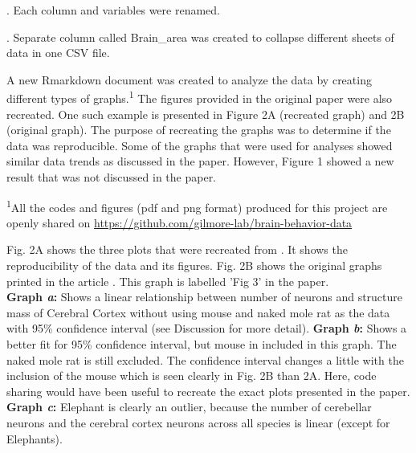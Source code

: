 \documentclass[landscape,final,paperwidth=48in,paperheight=48in,fontscale=0.285]{baposter}
\begin{document}
\begin{poster}
{. Each column and variables were renamed.

. Separate column called Brain\_area was created to collapse different sheets of data in one CSV file.

\linespread{5cm} \indent A new Rmarkdown document was created to analyze the data by creating different types of graphs.\textsuperscript{1} The figures provided in the original paper were also recreated. One such example is presented in Figure 2A (recreated graph) and 2B (original graph). The purpose of recreating the graphs was to determine if the data was reproducible. Some of the graphs that were used for analyses showed similar data trends as discussed in the paper. However, Figure 1 showed a new result that was not discussed in the paper.

\scriptsize \linespread{1}
\noindent \textsuperscript{1}All the codes and figures (pdf and png format) produced for this project are openly shared on \url{https://github.com/gilmore-lab/brain-behavior-data}
    }

    {
      \smaller \noindent Fig. 2A shows the three plots that were recreated from \cite{herculano-houzel-2015}. It shows the reproducibility of the data and its figures. Fig. 2B shows the original graphs printed in the article \cite{herculano-houzel-2015}. This graph is labelled 'Fig 3' in the paper.\\
       \textbf{Graph \textit{a}:} Shows a linear relationship between number of neurons and structure mass of Cerebral Cortex without using mouse and naked mole rat as the data with 95\% confidence interval (see Discussion for more detail).
       \textbf{Graph \textit{b}:} Shows a better fit for 95\% confidence interval, but mouse in included in this graph. The naked mole rat is still excluded. The confidence interval changes a little with the inclusion of the mouse which is seen clearly in Fig. 2B than 2A. Here, code sharing would have been useful to recreate the exact plots presented in the paper.
       \textbf{Graph \textit{c}:} Elephant is clearly an outlier, because the number of cerebellar neurons and the cerebral cortex neurons across all species is linear (except for Elephants).
    }


\end{poster}
\end{document}
